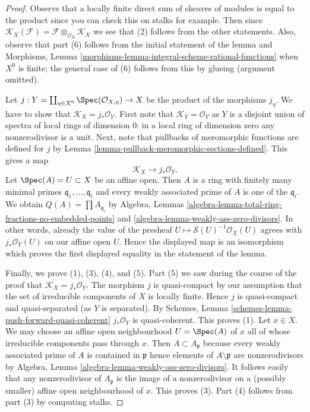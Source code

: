 \begin{proof}
Observe that a locally finite direct sum of sheaves of modules
is equal to the product since you can check this on stalks for
example. Then since $\mathcal{K}_X(\mathcal{F}) =
\mathcal{F} \otimes_{\mathcal{O}_X} \mathcal{K}_X$
we see that (2) follows from the other statements.
Also, observe that part (6) follows from the initial
statement of the lemma and Morphisms, Lemma
\ref{morphisms-lemma-integral-scheme-rational-functions}
when $X^0$ is finite; the general case of (6) follows from this
by glueing (argument omitted).

\medskip\noindent
Let $j : Y = \coprod\nolimits_{\eta \in X^0} \Spec(\mathcal{O}_{X, \eta}) \to X$
be the product of the morphisms $j_\eta$. We have to show that
$\mathcal{K}_X = j_*\mathcal{O}_Y$.
First note that $\mathcal{K}_Y = \mathcal{O}_Y$ as $Y$ is a disjoint
union of spectra of local rings of dimension $0$: in a local
ring of dimension zero any nonzerodivisor is a unit.
Next, note that pullbacks of meromorphic
functions are defined for $j$ by
Lemma \ref{lemma-pullback-meromorphic-sections-defined}.
This gives a map
$$
\mathcal{K}_X \longrightarrow j_*\mathcal{O}_Y.
$$
Let $\Spec(A) = U \subset X$ be an affine open. Then $A$ is a ring
with finitely many minimal primes $\mathfrak q_1, \ldots, \mathfrak q_t$
and every weakly associated prime of $A$ is one of the $\mathfrak q_i$.
We obtain $Q(A) = \prod A_{\mathfrak q_i}$
by Algebra, Lemmas \ref{algebra-lemma-total-ring-fractions-no-embedded-points}
and \ref{algebra-lemma-weakly-ass-zero-divisors}.
In other words, already the value of the presheaf
$U \mapsto \mathcal{S}(U)^{-1}\mathcal{O}_X(U)$ agrees with
$j_*\mathcal{O}_Y(U)$ on our affine open $U$. Hence the displayed
map is an isomorphism which proves the first displayed equality in
the statement of the lemma.

\medskip\noindent
Finally, we prove (1), (3), (4), and (5).
Part (5) we saw during the course of the proof that
$\mathcal{K}_X = j_*\mathcal{O}_Y$.
The morphism $j$ is quasi-compact by our assumption
that the set of irreducible components of $X$ is locally finite.
Hence $j$ is quasi-compact and quasi-separated (as $Y$ is separated).
By Schemes, Lemma \ref{schemes-lemma-push-forward-quasi-coherent}
$j_*\mathcal{O}_Y$ is quasi-coherent. This proves (1).
Let $x \in X$. We may choose an affine open neighbourhood
$U = \Spec(A)$ of $x$ all of whose irreducible components
pass through $x$. Then $A \subset A_\mathfrak p$ because every
weakly associated prime of $A$ is contained in $\mathfrak p$
hence elements of $A \setminus \mathfrak p$ are nonzerodivisors
by Algebra, Lemma \ref{algebra-lemma-weakly-ass-zero-divisors}.
It follows easily that any nonzerodivisor of $A_\mathfrak p$
is the image of a nonzerodivisor on a (possibly smaller)
affine open neighbourhood of $x$. This proves (3).
Part (4) follows from part (3) by computing stalks.
\end{proof}

